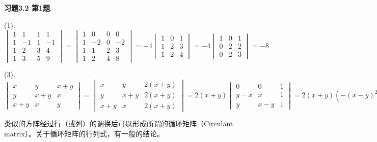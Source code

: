 \renewcommand{\newpageorvspace}{\vspace{2em}}

\date{第八次作业}



\maketitle

{\bf 习题3.2 第1题}.

(1). $\begin{vmatrix} 1 & 1 & 1 & 1 \\ 1 & -1 & 1 & -1 \\ 1 & 2 & 3 & 4 \\ 1 & 3 & 5 & 9 \end{vmatrix} = \begin{vmatrix} 1 & 0 & 0 & 0 \\ 1 & -2 & 0 & -2 \\ 1 & 1 & 2 & 3 \\ 1 & 2 & 4 & 8 \end{vmatrix} = -4 \begin{vmatrix} 1 & 0 & 1 \\ 1 & 2 & 3 \\ 1 & 2 & 4 \end{vmatrix} = -4 \begin{vmatrix} 1 & 0 & 1 \\ 0 & 2 & 2 \\ 0 & 2 & 3 \end{vmatrix} = -8$

(3). $\begin{vmatrix} x & y & x+y \\ y & x+y & x \\ x+y & x & y \end{vmatrix} = \begin{vmatrix} x & y & 2(x+y) \\ y & x+y & 2(x+y) \\ x+y & x & 2(x+y) \end{vmatrix} = 2(x+y)\begin{vmatrix} 0 & 0 & 1 \\ y-x & x & 1 \\ y & x-y & 1 \end{vmatrix} = 2(x+y)(-(x-y)^2-xy) = -2(x^3+y^3)$

类似的方阵经过行（或列）的调换后可以形成所谓的循环矩阵（Circulant matrix）。关于循环矩阵的行列式，有一般的结论。

